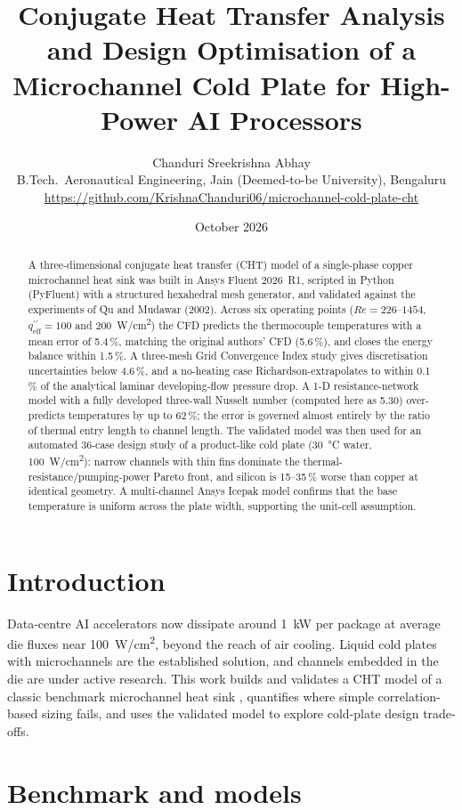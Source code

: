 \documentclass[10pt,a4paper]{article}
\title{\textbf{Conjugate Heat Transfer Analysis and Design Optimisation of a Microchannel Cold Plate for High-Power AI Processors}}
\author{Chanduri Sreekrishna Abhay\\\small B.Tech.\ Aeronautical Engineering, Jain (Deemed-to-be University), Bengaluru\\\small\url{https://github.com/KrishnaChanduri06/microchannel-cold-plate-cht}}
\date{October 2026}
\newcommand{\qeff}{q^{\prime\prime}_\mathrm{eff}}
\begin{document}
\maketitle

\begin{abstract}
\noindent A three-dimensional conjugate heat transfer (CHT) model of a single-phase copper microchannel heat sink was built in Ansys Fluent 2026~R1, scripted in Python (PyFluent) with a structured hexahedral mesh generator, and validated against the experiments of Qu and Mudawar (2002). Across six operating points ($Re = 226$--$1454$, $\qeff = 100$ and \SI{200}{W/cm^2}) the CFD predicts the thermocouple temperatures with a mean error of 5.4\,\%, matching the original authors' CFD (5.6\,\%), and closes the energy balance within 1.5\,\%. A three-mesh Grid Convergence Index study gives discretisation uncertainties below 4.6\,\%, and a no-heating case Richardson-extrapolates to within 0.1\,\% of the analytical laminar developing-flow pressure drop. A 1-D resistance-network model with a fully developed three-wall Nusselt number (computed here as 5.30) over-predicts temperatures by up to 62\,\%; the error is governed almost entirely by the ratio of thermal entry length to channel length. The validated model was then used for an automated 36-case design study of a product-like cold plate (\SI{30}{\celsius} water, \SI{100}{W/cm^2}): narrow channels with thin fins dominate the thermal-resistance/pumping-power Pareto front, and silicon is 15--35\,\% worse than copper at identical geometry. A multi-channel Ansys Icepak model confirms that the base temperature is uniform across the plate width, supporting the unit-cell assumption.
\end{abstract}

\section{Introduction}
Data-centre AI accelerators now dissipate around \SI{1}{kW} per package at average die fluxes near \SI{100}{W/cm^2}, beyond the reach of air cooling. Liquid cold plates with microchannels are the established solution, and channels embedded in the die are under active research. This work builds and validates a CHT model of a classic benchmark microchannel heat sink \cite{qu2002}, quantifies where simple correlation-based sizing fails, and uses the validated model to explore cold-plate design trade-offs.

\section{Benchmark and models}
\end{document}

